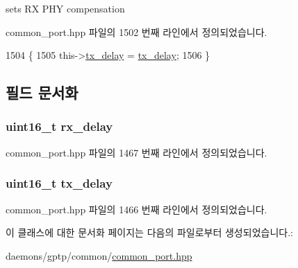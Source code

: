 sets RX P\+HY compensation 



common\+\_\+port.\+hpp 파일의 1502 번째 라인에서 정의되었습니다.


\begin{DoxyCode}
1504     \{
1505         this->\hyperlink{classphy__delay__spec__t_a70035b9951b2e0b8c74d7dd90096f279}{tx\_delay} = \hyperlink{classphy__delay__spec__t_a70035b9951b2e0b8c74d7dd90096f279}{tx\_delay};
1506     \}
\end{DoxyCode}


\subsection{필드 문서화}
\subsubsection[{\texorpdfstring{rx\+\_\+delay}{rx_delay}}]{\setlength{\rightskip}{0pt plus 5cm}uint16\+\_\+t rx\+\_\+delay\hspace{0.3cm}{\ttfamily [private]}}\hypertarget{classphy__delay__spec__t_a8a9e152109919f43c26fe6cfa5afea96}{}\label{classphy__delay__spec__t_a8a9e152109919f43c26fe6cfa5afea96}


common\+\_\+port.\+hpp 파일의 1467 번째 라인에서 정의되었습니다.

\subsubsection[{\texorpdfstring{tx\+\_\+delay}{tx_delay}}]{\setlength{\rightskip}{0pt plus 5cm}uint16\+\_\+t tx\+\_\+delay\hspace{0.3cm}{\ttfamily [private]}}\hypertarget{classphy__delay__spec__t_a70035b9951b2e0b8c74d7dd90096f279}{}\label{classphy__delay__spec__t_a70035b9951b2e0b8c74d7dd90096f279}


common\+\_\+port.\+hpp 파일의 1466 번째 라인에서 정의되었습니다.



이 클래스에 대한 문서화 페이지는 다음의 파일로부터 생성되었습니다.\+:\begin{DoxyCompactItemize}
\item 
daemons/gptp/common/\hyperlink{common__port_8hpp}{common\+\_\+port.\+hpp}\end{DoxyCompactItemize}
